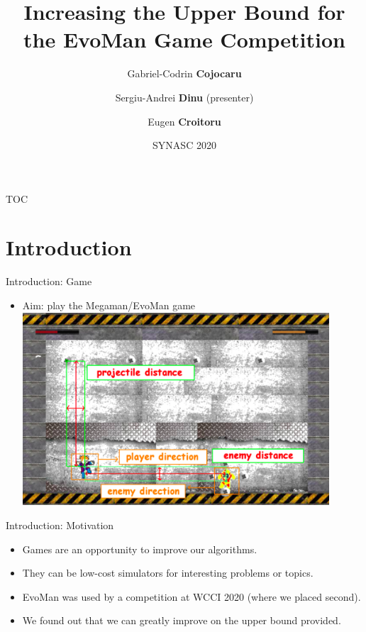 \documentclass[boxes]{beamer}
\begin{document}
\title{Increasing the Upper Bound for the EvoMan Game Competition}

\author{Gabriel-Codrin \textbf{Cojocaru} \and Sergiu-Andrei \textbf{Dinu} (presenter) \and Eugen \textbf{Croitoru} }


\date{SYNASC 2020}

\maketitle

\begin{frame}{TOC}
  \tableofcontents
  \end{frame}

\section{Introduction}
\begin{frame}{Introduction: Game}
  \begin{itemize}
  \item Aim: play the Megaman/EvoMan game
    \includegraphics[width=0.9\textwidth]{images/Evoman3.png}
  \end{itemize}
\end{frame}

\begin{frame}{Introduction: Motivation}
  \begin{itemize}
  \item Games are an opportunity to improve our algorithms.
  \item They can be low-cost simulators for interesting problems or topics.
  \item EvoMan was used by a competition at WCCI 2020 (where we placed second). 
  \item We found out that we can greatly improve on the upper bound provided.
  \end{itemize}
\end{frame}
\end{document}
